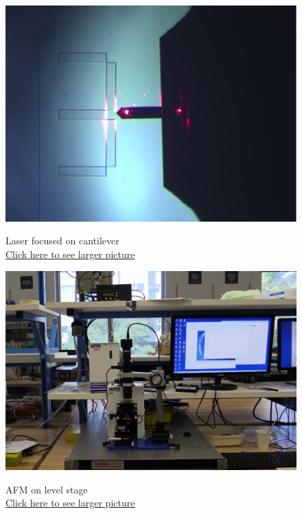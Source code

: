 \documentclass{../lab}
\begin{document}
\begin{figure}[H]
  \href{http://experimentationlab.berkeley.edu/sites/default/files/AFMImages/bothfocused.JPG}{\includegraphics[width=\linewidth,keepaspectratio]{images/bothfocused2.jpg}}
  \caption{Laser focused on cantilever \\
  \href{http://experimentationlab.berkeley.edu/sites/default/files/AFMImages/bothfocused.JPG}{Click here to see larger picture}}
  \label{fig:CantileverLaser}
\endminipage\hfill
{}
  \href{http://experimentationlab.berkeley.edu/sites/default/files/AFMImages/AFMstation.jpg}{\includegraphics[width=\linewidth,keepaspectratio]{images/AFMstation.jpg}}
  \caption{AFM on level stage \\ \href{http://experimentationlab.berkeley.edu/sites/default/files/AFMImages/AFMstation.jpg}{Click here to see larger picture}}\label{fig:LevelStage}
\endminipage
\end{figure}
\end{document}
